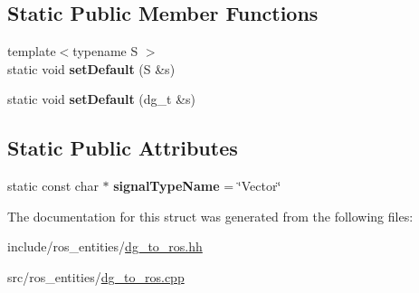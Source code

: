 \subsection*{Static Public Member Functions}
\begin{DoxyCompactItemize}
\item 
{\footnotesize template$<$typename S $>$ }\\static void {\bfseries set\+Default} (S \&s)\hypertarget{structdynamic__graph_1_1DgToRos_3_01Vector_01_4_a4013c3ef593096b73247ea076a67bcd0}{}\label{structdynamic__graph_1_1DgToRos_3_01Vector_01_4_a4013c3ef593096b73247ea076a67bcd0}

\item 
static void {\bfseries set\+Default} (dg\+\_\+t \&s)\hypertarget{structdynamic__graph_1_1DgToRos_3_01Vector_01_4_a6036a3447dfb27b19bca8495651c2a01}{}\label{structdynamic__graph_1_1DgToRos_3_01Vector_01_4_a6036a3447dfb27b19bca8495651c2a01}

\end{DoxyCompactItemize}
\subsection*{Static Public Attributes}
\begin{DoxyCompactItemize}
\item 
static const char $\ast$ {\bfseries signal\+Type\+Name} = \char`\"{}Vector\char`\"{}\hypertarget{structdynamic__graph_1_1DgToRos_3_01Vector_01_4_a860bb1281b52ba284b82845c3a1d0f2f}{}\label{structdynamic__graph_1_1DgToRos_3_01Vector_01_4_a860bb1281b52ba284b82845c3a1d0f2f}

\end{DoxyCompactItemize}


The documentation for this struct was generated from the following files\+:\begin{DoxyCompactItemize}
\item 
include/ros\+\_\+entities/\hyperlink{dg__to__ros_8hh}{dg\+\_\+to\+\_\+ros.\+hh}\item 
src/ros\+\_\+entities/\hyperlink{dg__to__ros_8cpp}{dg\+\_\+to\+\_\+ros.\+cpp}\end{DoxyCompactItemize}
